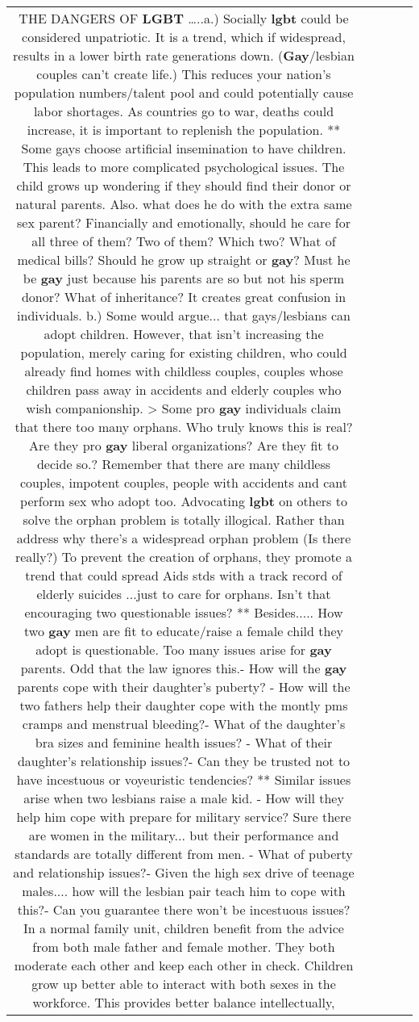 \documentclass[11pt]{article}
\newlength\mylength
\begin{document}
\begin{center}
\begin{longtable}{|C{.65\mylength}|C{.30\mylength}|C{.12\mylength}|C{.12\mylength}|C{.12\mylength}|}
  \small THE DANGERS OF \textbf{LGBT} …..a.) Socially \textbf{lgbt} could be considered unpatriotic. It is a trend, which if widespread, results in a lower birth rate generations down. (\textbf{Gay}/lesbian couples can't create life.) This reduces your nation's population numbers/talent pool and could potentially cause labor shortages. As countries go to war, deaths could increase, it is important to replenish the population. ** Some gays choose artificial insemination to have children. This leads to more complicated psychological issues. The child grows up wondering if they should find their donor or natural parents. Also. what does he do with the extra same sex parent? Financially and emotionally, should he care for all three of them? Two of them? Which two? What of medical bills? Should he grow up straight or \textbf{gay}? Must he be \textbf{gay} just because his parents are so but not his sperm donor? What of inheritance? It creates great confusion in individuals. b.) Some would argue... that gays/lesbians can adopt children. However, that isn't increasing the population, merely caring for existing children, who could already find homes with childless couples, couples whose children pass away in accidents and elderly couples who wish companionship. > Some pro \textbf{gay} individuals claim that there too many orphans. Who truly knows this is real? Are they pro \textbf{gay} liberal organizations? Are they fit to decide so.? Remember that there are many childless couples, impotent couples, people with accidents and cant perform sex who adopt too. Advocating \textbf{lgbt} on others to solve the orphan problem is totally illogical. Rather than address why there's a widespread orphan problem (Is there really?) To prevent the creation of orphans, they promote a trend that could spread Aids stds with a track record of elderly suicides ...just  to care for orphans. Isn't that encouraging two questionable issues?  ** Besides..... How two \textbf{gay} men are fit to educate/raise a female child they adopt is questionable.  Too many issues arise for \textbf{gay} parents. Odd that the law ignores this.- How will the \textbf{gay} parents cope with their daughter's puberty? - How will the two fathers help their daughter cope with the montly pms cramps and menstrual bleeding?- What of the daughter's bra sizes and feminine health issues? - What of their daughter's relationship issues?- Can they be trusted not to have incestuous or voyeuristic tendencies? ** Similar issues arise when two lesbians raise a male kid. - How will they help him cope with  prepare for military service? Sure there are women in the military... but their performance and standards are totally different from men. - What of puberty and relationship issues?- Given the high sex drive of teenage males.... how will the lesbian pair teach him to cope with this?- Can you guarantee there won't be incestuous issues?In a normal family unit, children benefit from the advice from both male father and female mother. They both moderate each other and keep each other in check. Children grow up better able to interact with both sexes in the workforce. This provides better balance intellectually, 
\end{longtable}
\end{center}
\end{document}
